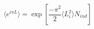 \begin{equation}
\label{gauss}
\langle e^{i\pi L}\rangle=\exp [\frac{-\pi^2}{2}\langle L_i^2\rangle N_{ind}]
\end{equation}

